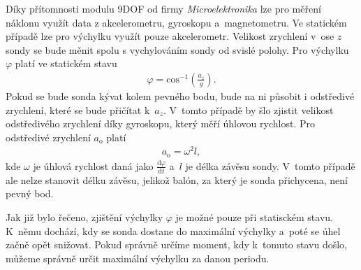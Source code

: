 \documentclass[twoside]{ctuthesis}
\newcommand{\diff}{\text{d}}
\theoremstyle{plain}
\theoremstyle{definition}
\theoremstyle{note}
\begin{document}
		Díky přítomnosti modulu 9DOF od firmy \textit{Microelektronika} lze pro měření náklonu využít data z akcelerometru, gyroskopu a~magnetometru. Ve statickém případě lze pro výchylku využít pouze akcelerometr. Velikost zrychlení v~ose $z$ sondy se bude měnit spolu s vychylováním sondy od svislé polohy. Pro výchylku $\varphi$ platí ve statickém stavu
		\begin{align}
			\varphi = \text{cos}^{-1}\left(\frac{a_z}{g}\right).
		\end{align}
		Pokud se bude sonda kývat kolem pevného bodu, bude na ni působit i odstředivé zrychlení, které se bude přičítat k~$a_z$. V~tomto případě by šlo zjistit velikost odstředivého zrychlení díky gyroskopu, který měří úhlovou rychlost. Pro odstředivé zrychlení $a_\text{o}$ platí
		\begin{align}
			a_\text{o} = \omega^2 l,
		\end{align}
		kde $\omega$ je úhlová rychlost daná jako $\frac{\diff \varphi}{\diff t}$ a~$l$ je délka závěsu sondy. V~tomto případě ale nelze stanovit délku závěsu, jelikož balón, za který je sonda přichycena, není pevný bod.

		Jak již bylo řečeno, zjištění výchylky $\varphi$ je možné pouze při statisckém stavu. K~němu dochází, kdy se sonda dostane do maximální výchylky a~poté se úhel začně opět snižovat. Pokud správně určíme moment, kdy k~tomuto stavu došlo, můžeme správně určit maximální výchylku za danou periodu. 
\end{document}
